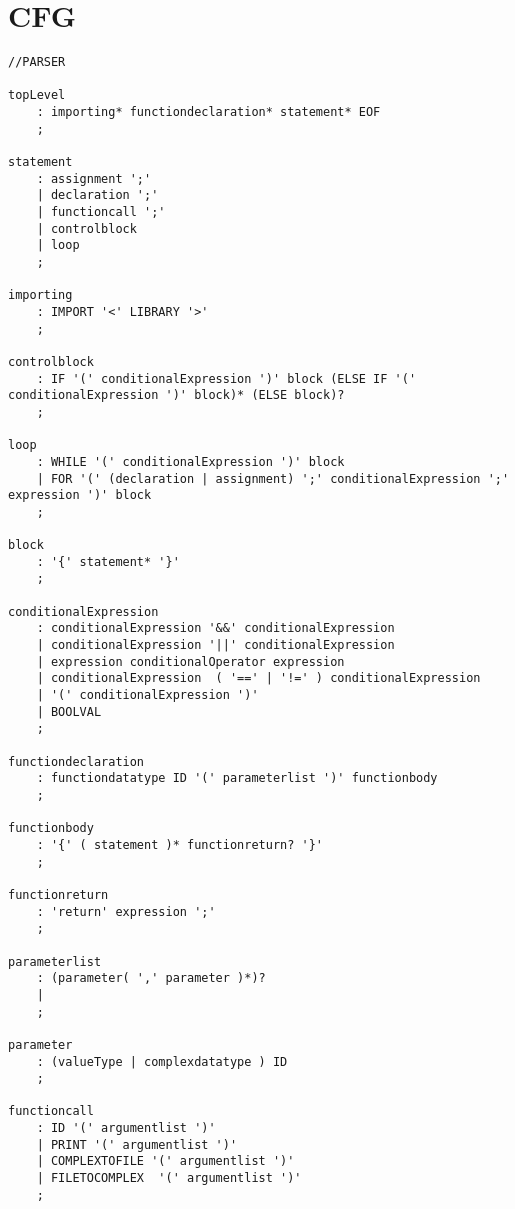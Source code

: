 \chapter{CFG}\label{app:CFG}
\begin{lstlisting}[caption={\acrshort{cfg} and Lexing rules},frame=tlrb,numbers=none]
//PARSER

topLevel
    : importing* functiondeclaration* statement* EOF
    ;

statement
    : assignment ';'
    | declaration ';'
    | functioncall ';'
    | controlblock
    | loop
    ;

importing
    : IMPORT '<' LIBRARY '>'
    ; 

controlblock
    : IF '(' conditionalExpression ')' block (ELSE IF '(' conditionalExpression ')' block)* (ELSE block)?
    ;

loop
    : WHILE '(' conditionalExpression ')' block
    | FOR '(' (declaration | assignment) ';' conditionalExpression ';' expression ')' block
    ;

block
    : '{' statement* '}'
    ;
                                                                       
conditionalExpression                                                  
    : conditionalExpression '&&' conditionalExpression                 
    | conditionalExpression '||' conditionalExpression                 
    | expression conditionalOperator expression                        
    | conditionalExpression  ( '==' | '!=' ) conditionalExpression     
    | '(' conditionalExpression ')'                                    
    | BOOLVAL                                                          
    ;                                                                  
                                                                       
functiondeclaration
    : functiondatatype ID '(' parameterlist ')' functionbody
    ; 
    
functionbody
    : '{' ( statement )* functionreturn? '}'
    ;

functionreturn
    : 'return' expression ';'
    ;

parameterlist
    : (parameter( ',' parameter )*)?
    | 
    ;

parameter
    : (valueType | complexdatatype ) ID
    ;                                      
                                           
functioncall                               
    : ID '(' argumentlist ')'              
    | PRINT '(' argumentlist ')'           
    | COMPLEXTOFILE '(' argumentlist ')'   
    | FILETOCOMPLEX  '(' argumentlist ')'  
    ;                                      


\end{lstlisting}
